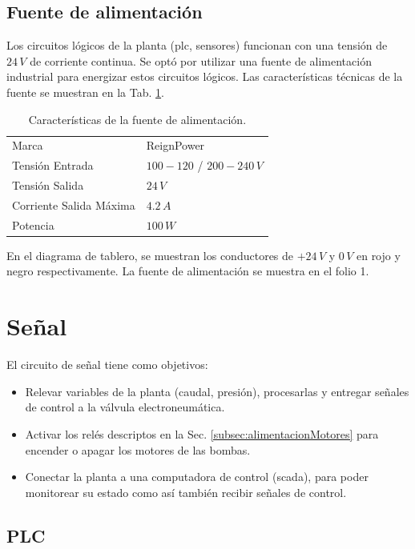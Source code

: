 \subsection{Fuente de alimentación}
\label{subsec:fuenteAlim}
Los circuitos lógicos de la planta (\gls{plc}, sensores) funcionan con una
tensión de $24\,V$ de corriente continua.
Se optó por utilizar una fuente de alimentación industrial para energizar estos
circuitos lógicos.
Las características técnicas de la fuente se muestran en la Tab.
\ref{tab:fuenteAlim}.
\begin{table}[h]
\centering
\begin{tabular}{|l|l|}
\hline
Marca & ReignPower\\
Tensión Entrada& $100-120$ / $200-240\,V$\\
Tensión Salida& $24\,V$\\
Corriente Salida Máxima& $4.2\,A$\\
Potencia & $100\,W$\\
\hline
\end{tabular}
\caption{Características de la fuente de alimentación.}
\label{tab:fuenteAlim}
\end{table}

En el diagrama de tablero, se muestran los conductores de $+24\,V$ y $0\,V$ en
rojo y negro respectivamente.
La fuente de alimentación se muestra en el folio 1.

\section{Señal}
\label{sec:Senal}

El circuito de señal tiene como objetivos:
\begin{itemize}
 \item Relevar variables de la planta (caudal, presión), procesarlas y entregar
señales de control a la válvula electroneumática.
\item Activar los relés descriptos en la Sec.
\ref{subsec:alimentacionMotores} para encender o apagar los motores de las
bombas.
\item Conectar la planta a una computadora de control (\gls{scada}), para poder
monitorear su estado como así también recibir señales de control.
\end{itemize}

\subsection{PLC}
\label{subsec:plc}

